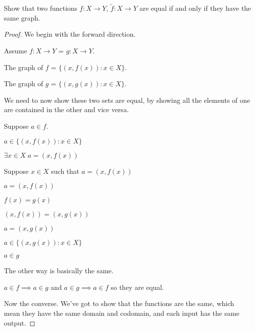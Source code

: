 \documentclass[../../main.tex]{subfiles}
\begin{document}
\begin{enumerate}
    \item \begin{q}
        Show that two functions $f : X \to Y$, $\tilde{f} : X \to Y$ are equal if and only if they have the same graph.
    \end{q}
    \begin{proof}
        We begin with the forward direction.
        \begin{lxl}
            \item Assume $f : X \to Y$ = $g : X \to Y$.
            \item The graph of $f$ = $\{(x, f(x)) : x \in X\}$.
            \item The graph of $g$ = $\{(x, g(x)) : x \in X\}$.
        \end{lxl}
        We need to now show these two sets are equal, by showing all the elements of one are contained in the other and vice versa.
        \begin{lxl}[resume]
            \item Suppose $a \in f$.
            \begin{lxl}
                \item $a \in \{(x, f(x)) : x \in X\}$
                \item $\exists x \in X \; a = (x, f(x))$ 
                \item Suppose $x \in X$ such that $a = (x, f(x))$
                \begin{lxl}
                    \item $a = (x, f(x))$
                    \item $f(x)=g(x)$
                    \item $(x, f(x)) = (x, g(x))$
                    \item $a = (x, g(x))$
                \end{lxl}
                \item $a \in \{(x, g(x)) : x \in X\}$
                \item $a \in g$
            \end{lxl}
            \item The other way is basically the same.
            \item $a \in f \implies a \in g$ and $a \in g \implies a \in f$ so they are equal.
        \end{lxl}
        Now the converse.
        We've got to show that the functions are the same, which mean they have the same domain and codomain, and each input has the same output.

\end{proof}
\end{enumerate}
\end{document}
